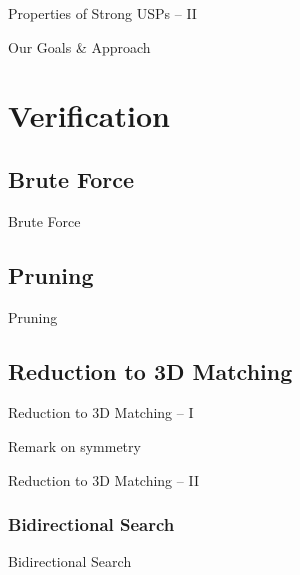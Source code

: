 \documentclass[t,10pt,
mathserif,xcolor=dvipsnames]{beamer}
\begin{document}
\begin{myframe}{Properties of Strong USPs -- II}

\end{myframe}

\begin{myframe}{Our Goals \& Approach}

\end{myframe}

\section{Verification}


\subsection{Brute Force}

\begin{myframe}{Brute Force}

\end{myframe}

\subsection{Pruning}

\begin{myframe}{Pruning}

\end{myframe}

\subsection{Reduction to 3D Matching}

\begin{myframe}{Reduction to 3D Matching -- I}

Remark on symmetry
  
\end{myframe}

\begin{myframe}{Reduction to 3D Matching -- II}

\end{myframe}

\subsubsection{Bidirectional Search}

\begin{myframe}{Bidirectional Search}

\end{myframe}
\end{document}
